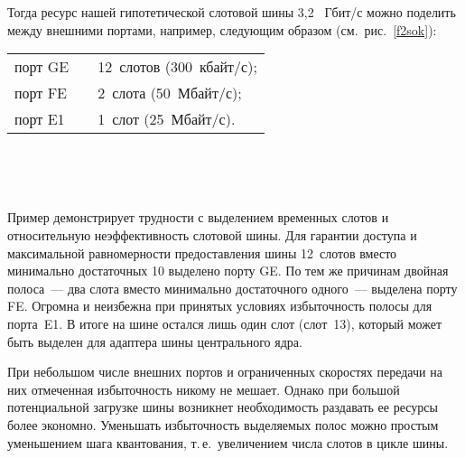 \begin{multicols}{2}
    Тогда ресурс нашей гипотетической слотовой шины 3,2~ Гбит/с можно поделить между
внешними портами, например, следующим образом (см.\ рис.~\ref{f2sok}):
\begin{center}
\begin{tabular}{lp{0.5mm}l}
порт GE && 12~слотов (300~кбайт/с);\\
порт FE &&   2~слота (50~Мбайт/с);\\
порт E1 &&  1~слот   (25~Мбайт/с).
\end{tabular}
\end{center}


\begin{figure*} %
\vspace*{1pt}
\begin{center}
\mbox{%
\epsfxsize=159.819mm
}
\end{center}
\vspace*{-9pt}
    \end{figure*}
    \begin{figure*} %
\vspace*{1pt}
\begin{center}
\mbox{%
\epsfxsize=164.843mm
}
\end{center}
\vspace*{-9pt}
    \end{figure*}

    Пример демонстрирует трудности с выделением временных слотов и относительную
неэффективность слотовой шины. Для гарантии доступа и максимальной равномерности
предоставления шины 12~слотов вместо минимально достаточных 10 выделено порту GE. По
тем же причинам двойная полоса~--- два слота вместо минимально достаточного одного~---
выделена порту FE. Огромна и неизбежна при принятых условиях избыточность полосы для
порта~E1. В итоге на шине остался лишь один слот (слот~13), который может быть выделен для
адаптера шины центрального ядра.

    При небольшом числе внешних портов и ограниченных скоростях передачи на них
отмеченная избыточность никому не мешает. Однако при большой потенциальной загрузке
шины возникнет необходимость раздавать ее ресурсы более экономно. Уменьшать
избыточность выделяемых полос можно простым уменьшением шага квантования, т.\,е.\
увеличением числа слотов в цикле шины. 


\end{multicols}
